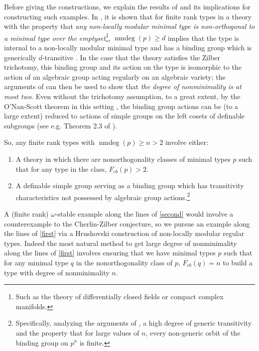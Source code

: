 \documentclass[11pt]{amsart}
\def\nmdeg{\mathop{\rm nmdeg}}
\newcommand{\sidebar}[1]{\vskip10pt\noindent
 \hskip.70truein\vrule width2.0pt\hskip.5em
 \vbox{\hsize= 4truein\noindent\footnotesize\relax #1 }\vskip10pt\noindent}
\def\nmdeg{\operatorname{nmdeg}}
\newcommand{\fcb}[1]{F_{cb}\left( #1  \right)}
\theoremstyle{definition}
\theoremstyle{remark}
\newcommand{\m}{\mathbb }
\numberwithin{equation}{section}
\begin{document}
Before giving the constructions, we explain the results of
\cite{freitag2023degree} and its implications for constructing such examples.
In \cite{freitag2023degree}, it is shown that for finite rank types in a
theory with the property that \emph{any non-locally modular minimal type is
non-orthogonal to a minimal type over the emptyset}\footnote{Such as the
theory of differentially closed fields or compact complex manifolds.},
$\nmdeg (p)\geq d$ implies that the type is internal to a non-locally modular
minimal type and has a binding group which is generically $d$-transitive
\cite[Section 2]{freitag2022any}. In the case that the theory satisfies the
Zilber trichotomy, this binding group and its action on the type is
isomorphic to the action of an algebraic group acting regularly on an
algebraic variety; the arguments of \cite{freitag2023degree} can then be used
to show that {\em the degree of nonminimality is at most two}. Even without
the trichotomy assumption, to a great extent, by the O'Nan-Scott theorem in
this setting \cite{macpherson1995primitive}, the binding group actions can be
(to a large extent) reduced to actions of simple groups on the left cosets of
definable subgroups (see e.g. Theorem 2.3 of \cite{freitag2023differential}).

So, any finite rank types with $\nmdeg(p)\geq n >2 $ involve either:
\begin{enumerate}
    \item \label{first} A theory in which there are nonorthogonality
        classes of minimal types $p$ such that for any type in the class,
        $\fcb{p}>2$.



    \item \label{second} A definable simple group serving as a binding
        group which has transitivity characteristics not possessed by
        algebraic group actions.\footnote{Specifically, analyzing the
        arguments of \cite{freitag2023degree}, a high degree of generic
        transitivity and the property that for large values of $n$, every
        non-generic orbit of the binding group on $p^n$ is finite.}
\end{enumerate}
A (finite rank) $\omega$-stable example along the lines of \ref{second} would
involve a counterexample to the Cherlin-Zilber conjecture, so we pursue an
example along the lines of \ref{first} via a Hrushovski construction of
non-locally modular regular types. Indeed the most natural method to get
large degree of nonminimality along the lines of \ref{first} involves
ensuring that we have minimal types $p$ such that for any minimal type $q$ in
the nonorthogonality class of $p$, $\fcb{q}=n$ to build a type with
degree of nonminimality $n$.
\end{document}
